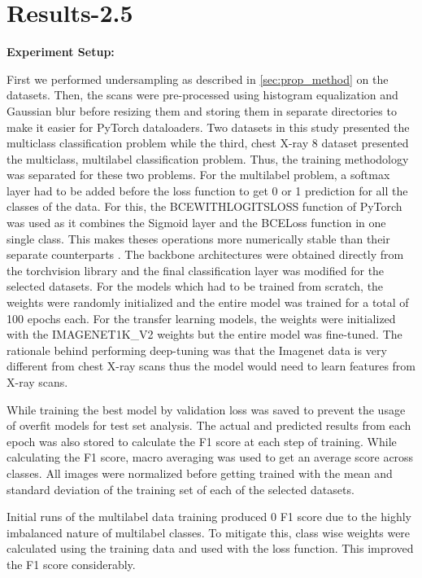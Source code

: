\documentclass[10pt,twocolumn,letterpaper]{article}
\begin{document}
\section{Results-2.5} 
\label{sec:method}
\textbf{Experiment Setup:}

First we performed undersampling as described in \cref{sec:prop_method} on the datasets. Then,
the scans were pre-processed using histogram equalization and Gaussian blur before resizing them 
and storing them in separate directories to make it easier for PyTorch dataloaders. 
Two datasets in this study presented the multiclass classification problem while the third, 
chest X-ray 8 dataset presented the multiclass, multilabel classification problem. Thus, the 
training methodology was separated for these two problems. For the multilabel problem, 
a softmax layer had to be added before the loss function to get 0 or 1 prediction for 
all the classes of the data. For this, the BCEWITHLOGITSLOSS function of PyTorch was used 
as it combines the Sigmoid layer and the BCELoss function in one single class. This makes 
theses operations more numerically stable than their separate counterparts \cite{bcelogits}.
The backbone architectures were obtained directly from the torchvision library and the final 
classification layer was modified for the selected datasets. For the models which had to be 
trained from scratch, the weights were randomly initialized and the entire model was trained 
for a total of 100 epochs each. For the transfer learning models, the weights were initialized 
with the IMAGENET1K\_V2 weights but the entire model was fine-tuned. The rationale behind 
performing deep-tuning was that the Imagenet data is very different from chest X-ray scans 
thus the model would need to learn features from X-ray scans. 

While training the best model by validation loss was saved to prevent the usage of overfit 
models for test set analysis. The actual and predicted results from each epoch was also stored 
to calculate the F1 score at each step of training. While calculating the F1 score, macro averaging 
was used to get an average score across classes. All images were normalized before getting trained 
with the mean and standard deviation of the training set of each of the selected datasets.

Initial runs of the multilabel data training produced 0 F1 score due to the highly imbalanced 
nature of multilabel classes. To mitigate this, class wise weights were calculated using the training 
data and used with the loss function. This improved the F1 score considerably. 
\end{document}

